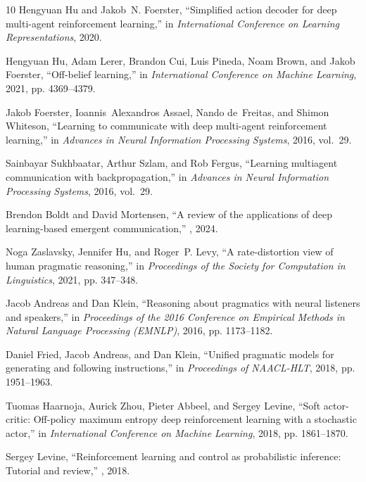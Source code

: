 \documentclass{article}
\begin{document}
\begin{thebibliography}{10}
Hengyuan Hu and Jakob~N. Foerster,
\newblock ``Simplified action decoder for deep multi-agent reinforcement learning,''
\newblock in {\em International Conference on Learning Representations}, 2020.

Hengyuan Hu, Adam Lerer, Brandon Cui, Luis Pineda, Noam Brown, and Jakob Foerster,
\newblock ``Off-belief learning,''
\newblock in {\em International Conference on Machine Learning}, 2021, pp. 4369--4379.

Jakob Foerster, Ioannis~Alexandros Assael, Nando de~Freitas, and Shimon Whiteson,
\newblock ``Learning to communicate with deep multi-agent reinforcement learning,''
\newblock in {\em Advances in Neural Information Processing Systems}, 2016, vol.~29.

Sainbayar Sukhbaatar, Arthur Szlam, and Rob Fergus,
\newblock ``Learning multiagent communication with backpropagation,''
\newblock in {\em Advances in Neural Information Processing Systems}, 2016, vol.~29.

Brendon Boldt and David Mortensen,
\newblock ``A review of the applications of deep learning-based emergent communication,''
, 2024.

Noga Zaslavsky, Jennifer Hu, and Roger~P. Levy,
\newblock ``A rate-distortion view of human pragmatic reasoning,''
\newblock in {\em Proceedings of the Society for Computation in Linguistics}, 2021, pp. 347--348.

Jacob Andreas and Dan Klein,
\newblock ``Reasoning about pragmatics with neural listeners and speakers,''
\newblock in {\em Proceedings of the 2016 Conference on Empirical Methods in Natural Language Processing (EMNLP)}, 2016, pp. 1173--1182.

Daniel Fried, Jacob Andreas, and Dan Klein,
\newblock ``Unified pragmatic models for generating and following instructions,''
\newblock in {\em Proceedings of NAACL-HLT}, 2018, pp. 1951--1963.

Tuomas Haarnoja, Aurick Zhou, Pieter Abbeel, and Sergey Levine,
\newblock ``Soft actor-critic: Off-policy maximum entropy deep reinforcement learning with a stochastic actor,''
\newblock in {\em International Conference on Machine Learning}, 2018, pp. 1861--1870.

Sergey Levine,
\newblock ``Reinforcement learning and control as probabilistic inference: Tutorial and review,''
, 2018.


\end{thebibliography}
\end{document}
